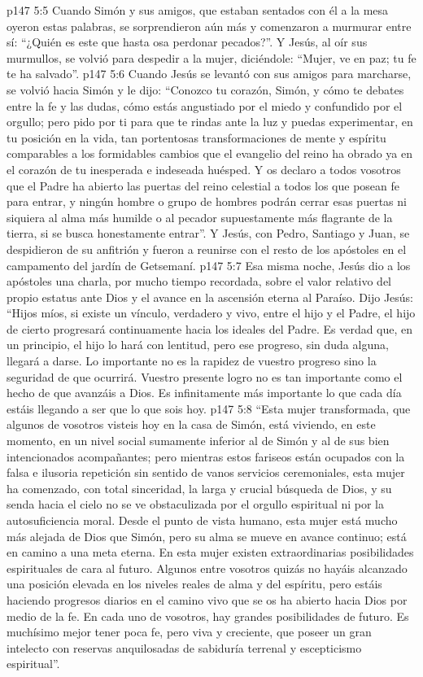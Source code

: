 \vs p147 5:5 \pc Cuando Simón y sus amigos, que estaban sentados con él a la mesa oyeron estas palabras, se sorprendieron aún más y comenzaron a murmurar entre sí: “¿Quién es este que hasta osa perdonar pecados?”. Y Jesús, al oír sus murmullos, se volvió para despedir a la mujer, diciéndole: “Mujer, ve en paz; tu fe te ha salvado”.
\vs p147 5:6 Cuando Jesús se levantó con sus amigos para marcharse, se volvió hacia Simón y le dijo: “Conozco tu corazón, Simón, y cómo te debates entre la fe y las dudas, cómo estás angustiado por el miedo y confundido por el orgullo; pero pido por ti para que te rindas ante la luz y puedas experimentar, en tu posición en la vida, tan portentosas transformaciones de mente y espíritu comparables a los formidables cambios que el evangelio del reino ha obrado ya en el corazón de tu inesperada e indeseada huésped. Y os declaro a todos vosotros que el Padre ha abierto las puertas del reino celestial a todos los que posean fe para entrar, y ningún hombre o grupo de hombres podrán cerrar esas puertas ni siquiera al alma más humilde o al pecador supuestamente más flagrante de la tierra, si se busca honestamente entrar”. Y Jesús, con Pedro, Santiago y Juan, se despidieron de su anfitrión y fueron a reunirse con el resto de los apóstoles en el campamento del jardín de Getsemaní.
\vs p147 5:7 \pc Esa misma noche, Jesús dio a los apóstoles una charla, por mucho tiempo recordada, sobre el valor relativo del propio estatus ante Dios y el avance en la ascensión eterna al Paraíso. Dijo Jesús: “Hijos míos, si existe un vínculo, verdadero y vivo, entre el hijo y el Padre, el hijo de cierto progresará continuamente hacia los ideales del Padre. Es verdad que, en un principio, el hijo lo hará con lentitud, pero ese progreso, sin duda alguna, llegará a darse. Lo importante no es la rapidez de vuestro progreso sino la seguridad de que ocurrirá. Vuestro presente logro no es tan importante como el hecho de que avanzáis  a Dios. Es infinitamente más importante lo que cada día estáis llegando a ser que lo que sois hoy.
\vs p147 5:8 “Esta mujer transformada, que algunos de vosotros visteis hoy en la casa de Simón, está viviendo, en este momento, en un nivel social sumamente inferior al de Simón y al de sus bien intencionados acompañantes; pero mientras estos fariseos están ocupados con la falsa e ilusoria repetición sin sentido de vanos servicios ceremoniales, esta mujer ha comenzado, con total sinceridad, la larga y crucial búsqueda de Dios, y su senda hacia el cielo no se ve obstaculizada por el orgullo espiritual ni por la autosuficiencia moral. Desde el punto de vista humano, esta mujer está mucho más alejada de Dios que Simón, pero su alma se mueve en avance continuo; está en camino a una meta eterna. En esta mujer existen extraordinarias posibilidades espirituales de cara al futuro. Algunos entre vosotros quizás no hayáis alcanzado una posición elevada en los niveles reales de alma y del espíritu, pero estáis haciendo progresos diarios en el camino vivo que se os ha abierto hacia Dios por medio de la fe. En cada uno de vosotros, hay grandes posibilidades de futuro. Es muchísimo mejor tener poca fe, pero viva y creciente, que poseer un gran intelecto con reservas anquilosadas de sabiduría terrenal y escepticismo espiritual”.
